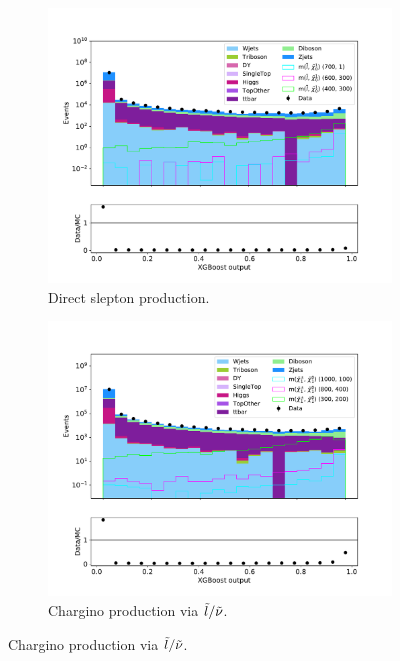 \begin{figure}[H]
    \centering
    \begin{subfigure}[t!]{0.49\textwidth}
        \includegraphics[width = \textwidth]{Figures/Stacked/stackedplot_BDT_All_level_slepslep.pdf}
        \caption{Direct slepton production.}
        \label{fig:SlepslepNNLow}
    \end{subfigure}
    \begin{subfigure}[t!]{0.49\textwidth}
        \includegraphics[width = \textwidth]{Figures/Stacked/stackedplot_BDT_All_level_slepsnu.pdf}
        \caption{Chargino production via $\Tilde{l}/\Tilde{\nu}$.}

\end{subfigure}
\end{figure}
